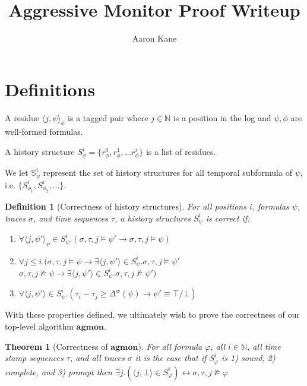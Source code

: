 \documentclass[10pt,a4paper]{article}
\title{Aggressive Monitor Proof Writeup}
\author{Aaron Kane}
\newcommand{\rp}[2]{\ensuremath{\langle #1, #2 \rangle}}
\newcommand{\agmon}{\ensuremath{\mathbf{agmon}}}
\newcommand{\pst}{\ensuremath{S^i_\psi}}
\newcommand{\rpt}[3]{\ensuremath{\langle #1, #2 \rangle}_{#3}}
\newtheorem{thm}{Theorem}
\newtheorem{tdef}{Definition}
\begin{document}
\maketitle

\section{Definitions}

A residue $\rp{j}{\psi}_\phi$ is a tagged pair where $j \in \mathbb{N}$ is a position in the log and $\psi, \phi$ are well-formed formulas.

A history structure $S_{\phi}^i = \{ r_{\phi}^0, r_{\phi}^1, \ldots r_{\phi}^i \}$ is a list of residues.

We let $\mathbb{S}^i_{\psi}$ represent the set of history structures for all temporal subformula of $\psi$, i.e. $\{S^i_{\phi_1}, S^i_{\phi_2}, \ldots\}$.


\begin{tdef}[Correctness of history structures] For all positions $i$, formulas $\psi$, traces $\sigma$, and time sequences $\tau$, a history structures $S^i_{\psi}$ is correct if:
\begin{enumerate}
	\item {} $\forall \rpt{j}{\psi'}{\psi} \in \pst.(\sigma, \tau, j \vDash \psi' \rightarrow \sigma, \tau, j \vDash \psi)$
	\item {} $\forall j \leq i.(\sigma, \tau, j \vDash \psi \rightarrow \exists \rp{j}{\psi'} \in \pst. \sigma, \tau, j \vDash \psi'$  $\sigma, \tau, j \nvDash \psi \rightarrow \exists \rp{j}{\psi'} \in \pst. \sigma, \tau, j \nvDash \psi')$
	\item {} $\forall \rp{j}{\psi'} \in \pst.(\tau_i - \tau_j \geq \Delta^w(\psi) \rightarrow \psi' \equiv \top/\bot)$
\end{enumerate}
\end{tdef}


With these properties defined, we ultimately wish to prove the correctness of our top-level algorithm \agmon.

\begin{thm}[Correctness of \agmon]
For all formula $\varphi$, all $i \in \mathbb{N}$, all time stamp sequences $\tau$, and all traces $\sigma$ it is the case that if $S^i_{\varphi}$ is 1) sound, 2) complete, and 3) prompt then $\exists j.(\rp{j}{\bot} \in S^i_{\varphi}) \leftrightarrow \sigma, \tau, j \nvDash \varphi$
\end{thm}
\end{document}
